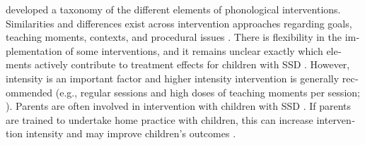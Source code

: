 \documentclass[output=paper,colorlinks,citecolor=brown]{langscibook}
\begin{document}
\begin{otherlanguage}{english}
\citet{Baker2018} developed a taxonomy of the different elements of phonological interventions. Similarities and differences exist across intervention approaches regarding goals, teaching moments, contexts, and procedural issues \citep{Baker2018}. There is flexibility in the implementation of some interventions, and it remains unclear exactly which elements actively contribute to treatment effects for children with SSD \citep{Baker2018}. However, intensity is an important factor and higher intensity intervention is generally recommended (e.g., regular sessions and high doses of teaching moments per session; \citealp{Baker2012}). Parents are often involved in intervention with children with SSD \citep{Oliveira2015}. If parents are trained to undertake home practice with children, this can increase intervention intensity and may improve children’s outcomes \citep{Sugden2018}. 





\end{otherlanguage}
\end{document}
